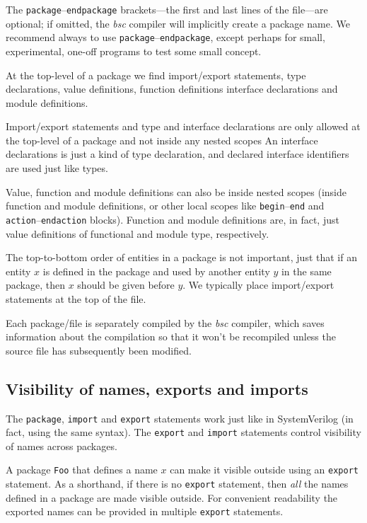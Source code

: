 The \verb|package|--\verb|endpackage| brackets---the first and last
lines of the file---are optional; if omitted, the \emph{bsc} compiler
will implicitly create a package name.  We recommend always to use
\verb|package|--\verb|endpackage|, except perhaps for small,
experimental, one-off programs to test some small concept.

At the top-level of a package we find import/export statements, type
declarations, value definitions, function definitions interface
declarations and module definitions.

Import/export statements and type and interface declarations are only
allowed at the top-level of a package and not inside any nested scopes
An interface declarations is just a kind of type declaration, and
declared interface identifiers are used just like types.

Value, function and module definitions can also be inside nested
scopes (inside function and module definitions, or other local scopes
like \verb|begin|--\verb|end| and \verb|action|--\verb|endaction|
blocks).  Function and module definitions are, in fact, just value
definitions of functional and module type, respectively.

The top-to-bottom order of entities in a package is not important,
just that if an entity $x$ is defined in the package and used by
another entity $y$ in the same package, then $x$ should be given
before $y$.  We typically place import/export statements at the top of
the file.

Each package/file is separately compiled by the \emph{bsc} compiler,
which saves information about the compilation so that it won't be
recompiled unless the source file has subsequently been modified.


\subsection{Visibility of names, exports and imports}

The \verb|package|, \verb|import| and \verb|export| statements work
just like in SystemVerilog (in fact, using the same syntax).  The
\verb|export| and \verb|import| statements control visibility of names
across packages.


A package \verb|Foo| that defines a name $x$ can make it visible
outside using an \verb|export| statement.  As a shorthand, if there is
no \verb|export| statement, then \emph{all} the names defined in a
package are made visible outside.  For convenient readability the
exported names can be provided in multiple \verb|export| statements.

